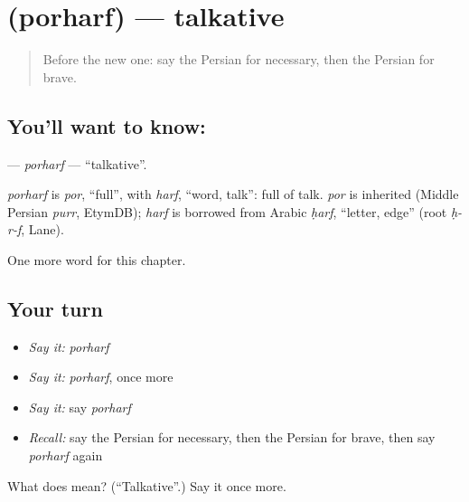 \section[\texorpdfstring{\fa{پرحرف} (porharf)}{پرحرف (porharf)}]{ (porharf) — talkative}

\label{lesson:FA-C162-porharf}



\begin{quote}
Before the new one: say the Persian for necessary, then the Persian for brave.
\end{quote}

\subsection*{You'll want to know: }
\textbf{} — \emph{porharf} — \textquotedblleft{}talkative\textquotedblright{}.

\begin{cousinweb}
\emph{porharf} is \emph{por}, \textquotedblleft{}full\textquotedblright{}, with \emph{harf}, \textquotedblleft{}word, talk\textquotedblright{}: full of talk. \emph{por} is inherited (Middle Persian \emph{purr}, EtymDB); \emph{harf} is borrowed from Arabic \emph{ḥarf}, \textquotedblleft{}letter, edge\textquotedblright{} (root \emph{ḥ-r-f}, Lane).
\end{cousinweb}

\begin{grammarlens}[title={What you've built}]
One more word for this chapter.
\end{grammarlens}

\subsection*{Your turn}
\begin{itemize}
\raggedright
  \item \emph{Say it:} \emph{porharf}
  \item \emph{Say it:} \emph{porharf}, once more
  \item \emph{Say it:} say \emph{porharf}
  \item \emph{Recall:} say the Persian for necessary, then the Persian for brave, then say \emph{porharf} again
\end{itemize}

\begin{tcolorbox}[breakable,colback=teal!4,colframe=teal!35!black,title={Before you move on}]
What does  mean? (\textquotedblleft{}Talkative\textquotedblright{}.) Say it once more.
\end{tcolorbox}
